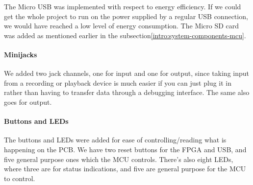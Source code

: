 The Micro USB was implemented with respect to energy efficiency. If we could get
the whole project to run on the power supplied by a regular USB connection, we
would have reached a low level of energy consumption. The Micro SD card was
added as mentioned earlier in the subsection\ref{intro:system-components-mcu}.

\paragraph{Minijacks}

We added two jack channels, one for input and one for output, since taking input
from a recording or playback device is much easier if you can just plug it in
rather than having to transfer data through a debugging interface. The same also
goes for output.

\paragraph{Buttons and LEDs}

The buttons and LEDs were added for ease of controlling/reading what is
happening on the PCB. We have two reset buttons for the FPGA and USB, and five
general purpose ones which the MCU controls. There's also eight LEDs, where
three are for status indications, and five are general purpose for the MCU to
control.
